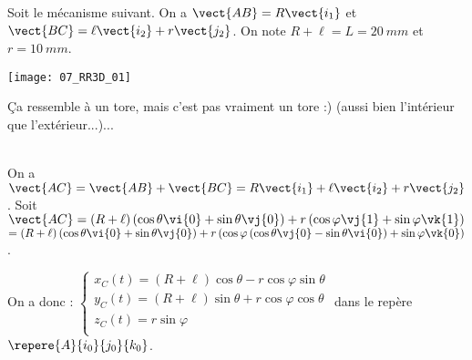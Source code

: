 \normalfalse \difficiletrue \tdifficilefalse
\correctiontrue


\setcounter{question}{0}
\ifcorrection
\else
{}
\fi

\ifprof
\else
Soit le mécanisme suivant. On a $\vect{AB}=R\vect{i_1}$ et $\vect{BC}=\ell\vect{i_2}+r\vect{j_2}$. On note $R+\ell=L = \SI{20}{mm}$ et $r=\SI{10}{mm}$.
\begin{marginfigure}
\texttt{[image: 07\_RR3D\_01]}
\end{marginfigure}
\fi


\ifprof
\else
{}
\fi

\ifprof
Ça ressemble à un tore, mais c'est pas vraiment un tore :) (aussi bien l'intérieur que l'extérieur...)...
\else
\fi

\ifprof ~\\
On a $\vect{AC}=\vect{AB}+\vect{BC} = R\vect{i_1} + \ell\vect{i_2}+r\vect{j_2}$. 
Soit $\vect{AC} = \left(R+\ell\right)\left(\cos\theta\vi{0} + \sin\theta\vj{0}\right)  + r\left(\cos\varphi \vj{1}+\sin\varphi \vk{1}\right)$  $= \left(R+\ell\right)\left(\cos\theta\vi{0} + \sin\theta\vj{0}\right)  + r\left(\cos\varphi \left(  \cos\theta\vj{0} - \sin\theta\vi{0}\right)+\sin\varphi \vk{0}\right)$.

On a donc :
$\left\{
\begin{array}{l}
x_C(t)= \left(R+\ell\right)\cos\theta  - r\cos\varphi  \sin\theta\\
y_C(t)= \left(R+\ell\right)\sin\theta  + r\cos\varphi \cos\theta \\
z_C(t)=  r\sin\varphi \\
\end{array}
\right.
$ dans le repère $\repere{A}{i_0}{j_0}{k_0}$.
\else
\fi

